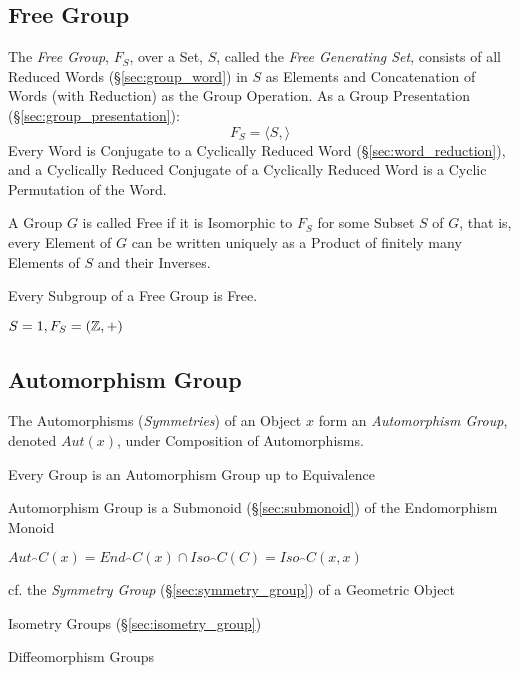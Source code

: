 \subsection{Free Group}\label{sec:free_group}

The \emph{Free Group}, $F_S$, over a Set, $S$, called the \emph{Free Generating
  Set}, consists of all Reduced Words (\S\ref{sec:group_word}) in $S$ as
Elements and Concatenation of Words (with Reduction) as the Group Operation. As
a Group Presentation (\S\ref{sec:group_presentation}):
\[
    F_S = \langle S, \rangle
\]
Every Word is Conjugate to a Cyclically Reduced Word
(\S\ref{sec:word_reduction}), and a Cyclically Reduced Conjugate of a
Cyclically Reduced Word is a Cyclic Permutation of the Word.

A Group $G$ is called Free if it is Isomorphic to $F_S$ for some
Subset $S$ of $G$, that is, every Element of $G$ can be written
uniquely as a Product of finitely many Elements of $S$ and their
Inverses.

Every Subgroup of a Free Group is Free. \cite{hatcher02}

$S = {1}, F_S = (\mathbb{Z},+)$



\subsection{Automorphism Group}\label{sec:automorphism_group}

The Automorphisms (\emph{Symmetries}) of an Object $x$ form an
\emph{Automorphism Group}, denoted $Aut(x)$, under Composition of Automorphisms.

Every Group is an Automorphism Group up to Equivalence %

Automorphism Group is a Submonoid (\S\ref{sec:submonoid}) of the Endomorphism
Monoid %

$Aut_\cat{C}(x) = End_\cat{C}(x) \cap Iso_\cat{C}(C) = Iso_\cat{C}(x,x)$

\fist cf. the \emph{Symmetry Group} (\S\ref{sec:symmetry_group}) of a Geometric
Object %

Isometry Groups (\S\ref{sec:isometry_group})

Diffeomorphism Groups %

